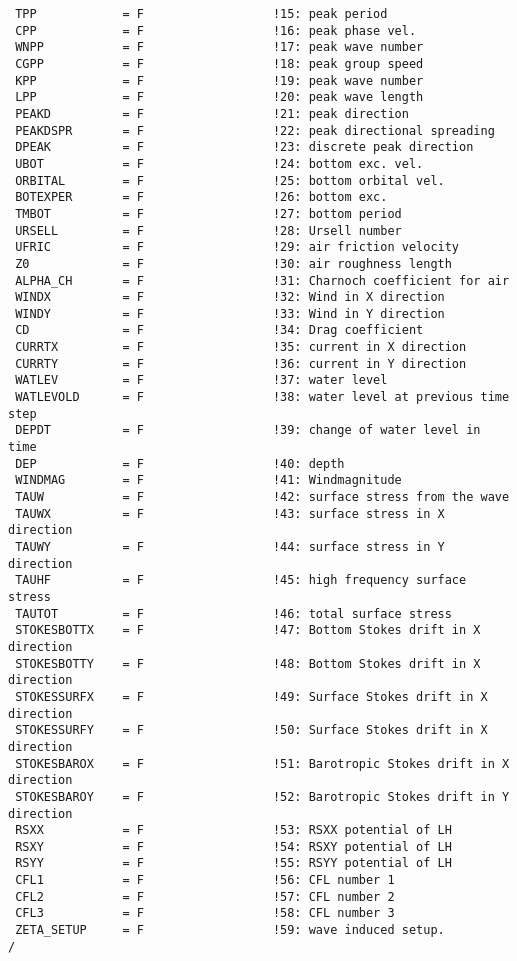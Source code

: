 \documentclass[12pt]{amsart}
\begin{document}
\begin{verbatim}
 TPP            = F                  !15: peak period  
 CPP            = F                  !16: peak phase vel. 
 WNPP           = F                  !17: peak wave number
 CGPP           = F                  !18: peak group speed
 KPP            = F                  !19: peak wave number
 LPP            = F                  !20: peak wave length 
 PEAKD          = F                  !21: peak direction
 PEAKDSPR       = F                  !22: peak directional spreading
 DPEAK          = F                  !23: discrete peak direction 
 UBOT           = F                  !24: bottom exc. vel. 
 ORBITAL        = F                  !25: bottom orbital vel. 
 BOTEXPER       = F                  !26: bottom exc.  
 TMBOT          = F                  !27: bottom period 
 URSELL         = F                  !28: Ursell number
 UFRIC          = F                  !29: air friction velocity
 Z0             = F                  !30: air roughness length
 ALPHA_CH       = F                  !31: Charnoch coefficient for air
 WINDX          = F                  !32: Wind in X direction
 WINDY          = F                  !33: Wind in Y direction
 CD             = F                  !34: Drag coefficient
 CURRTX         = F                  !35: current in X direction
 CURRTY         = F                  !36: current in Y direction
 WATLEV         = F                  !37: water level
 WATLEVOLD      = F                  !38: water level at previous time step
 DEPDT          = F                  !39: change of water level in time
 DEP            = F                  !40: depth
 WINDMAG        = F                  !41: Windmagnitude
 TAUW           = F                  !42: surface stress from the wave
 TAUWX          = F                  !43: surface stress in X direction
 TAUWY          = F                  !44: surface stress in Y direction
 TAUHF          = F                  !45: high frequency surface stress
 TAUTOT         = F                  !46: total surface stress
 STOKESBOTTX    = F                  !47: Bottom Stokes drift in X direction
 STOKESBOTTY    = F                  !48: Bottom Stokes drift in X direction
 STOKESSURFX    = F                  !49: Surface Stokes drift in X direction
 STOKESSURFY    = F                  !50: Surface Stokes drift in X direction
 STOKESBAROX    = F                  !51: Barotropic Stokes drift in X direction
 STOKESBAROY    = F                  !52: Barotropic Stokes drift in Y direction
 RSXX           = F                  !53: RSXX potential of LH
 RSXY           = F                  !54: RSXY potential of LH
 RSYY           = F                  !55: RSYY potential of LH
 CFL1           = F                  !56: CFL number 1
 CFL2           = F                  !57: CFL number 2
 CFL3           = F                  !58: CFL number 3
 ZETA_SETUP     = F                  !59: wave induced setup.
/
\end{verbatim}
\end{document}
